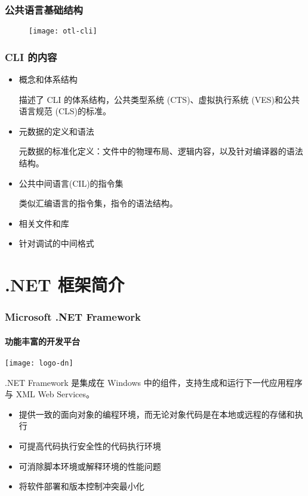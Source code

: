 \begin{frame}
\frametitle{公共语言基础结构}
\begin{figure}
\centering \texttt{[image: otl-cli]}
\end{figure}
\end{frame}

\begin{frame}
\frametitle{CLI 的内容}

\begin{itemize}
\CJKindent
\item 概念和体系结构

  描述了 CLI 的体系结构，公共类型系统 (CTS)、虚拟执行系统 (VES)和公共语言规范 (CLS)的标准。

\item 元数据的定义和语法

  元数据的标准化定义：文件中的物理布局、逻辑内容，以及针对编译器的语法结构。

\item 公共中间语言(CIL)的指令集

  类似汇编语言的指令集，指令的语法结构。

\item 相关文件和库
\item 针对调试的中间格式

\end{itemize}

\end{frame}

\section{.NET 框架简介}

\begin{frame}
\frametitle{Microsoft .NET Framework}
\framesubtitle{功能丰富的开发平台}

\centering \texttt{[image: logo-dn]}

.NET Framework 是集成在 Windows 中的组件，支持生成和运行下一代应用程序与 XML Web Services。

\begin{itemize}
\item 提供一致的面向对象的编程环境，而无论对象代码是在本地或远程的存储和执行
\item 可提高代码执行安全性的代码执行环境
\item 可消除脚本环境或解释环境的性能问题
\item 将软件部署和版本控制冲突最小化
\end{itemize}
\end{frame}

